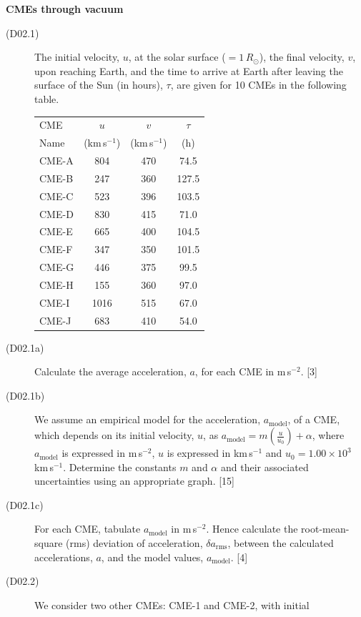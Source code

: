 \medskip\noindent\textbf{CMEs through vacuum}

\begin{description}
\item[(D02.1)] The initial velocity, $u$, at the solar surface
  ($= 1\,R_\odot$), the final velocity, $v$, upon reaching Earth, and the time
  to arrive at Earth after leaving the surface of the Sun (in hours), $\tau$,
  are given for 10 CMEs in the following table.

  \begin{center}
  \begin{tabular}{l c c c}
  \toprule
  CME & $u$ & $v$ & $\tau$\\
  Name & (km\,s$^{-1}$) & (km\,s$^{-1}$) & (h)\\
  \midrule
  CME-A & 804  & 470 & 74.5\\
  CME-B & 247  & 360 & 127.5\\
  CME-C & 523  & 396 & 103.5\\
  CME-D & 830  & 415 & 71.0\\
  CME-E & 665  & 400 & 104.5\\
  CME-F & 347  & 350 & 101.5\\
  CME-G & 446  & 375 & 99.5\\
  CME-H & 155  & 360 & 97.0\\
  CME-I & 1016 & 515 & 67.0\\
  CME-J & 683  & 410 & 54.0\\
  \bottomrule
  \end{tabular}
  \end{center}
\item[(D02.1a)] Calculate the average acceleration, $a$, for each CME in
  m\,s$^{-2}$. \hfill[3]
\item[(D02.1b)] We assume an empirical model for the acceleration,
  $a_{\mathrm{model}}$, of a CME, which depends on its initial velocity, $u$,
  as $a_{\mathrm{model}} = m\left(\frac{u}{u_0}\right) + \alpha$, where
  $a_{\mathrm{model}}$ is expressed in m\,s$^{-2}$, $u$ is expressed in
  km\,s$^{-1}$ and $u_0 = 1.00 \times 10^{3}$\,km\,s$^{-1}$. Determine the
  constants $m$ and $\alpha$ and their associated uncertainties using an
  appropriate graph. \hfill[15]
\item[(D02.1c)] For each CME, tabulate $a_{\mathrm{model}}$ in m\,s$^{-2}$.
  Hence calculate the root-mean-square (rms) deviation of acceleration,
  $\delta a_{\mathrm{rms}}$, between the calculated accelerations, $a$, and
  the model values, $a_{\mathrm{model}}$. \hfill[4]
\item[(D02.2)] We consider two other CMEs: CME-1 and CME-2, with initial

\end{description}
